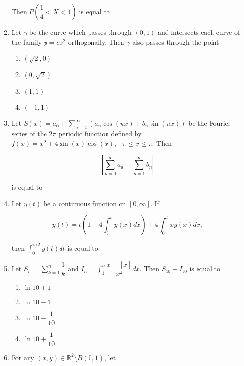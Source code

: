 \documentclass[journal]{IEEEtran}
\newcommand{\brak}[1]{\left( #1 \right)}
\newcommand{\sbrak}[1]{\left[ #1 \right]}
\newcommand{\abs}[1]{\left| #1 \right|}
\newcommand{\lt}{<}
\begin{document}
\begin{enumerate}
    Then $P\brak{\dfrac{1}{4} \lt X \lt 1}$ is equal to \underline{\hspace{2cm}}

\item Let $\gamma$ be the curve which passes through $\brak{0,1}$ and intersects each curve of the family $y = c x^2$ orthogonally. Then $\gamma$ also passes through the point

    \begin{enumerate}
        \item $\brak{\sqrt{2},0}$
        \item $\brak{0,\sqrt{2}}$
        \item $\brak{1,1}$
        \item $\brak{-1,1}$
    \end{enumerate}

\item Let $S\brak{x} = a_0 + \sum_{n=1}^{\infty}\brak{a_n \cos\brak{n x} + b_n \sin\brak{n x}}$ be the Fourier series of the $2 \pi$ periodic function defined by $f\brak{x} = x^2 + 4 \sin\brak{x} \cos\brak{x}, -\pi \le x \le \pi$. Then 

    $$\abs{\sum_{n=0}^{\infty} a_n - \sum_{n=1}^{\infty} b_n}$$

    is equal to \underline{\hspace{2cm}}

\item Let $y\brak{t}$ be a continuous function on $\sbrak{0,\infty}$. If

    $$y\brak{t} = t\brak{1 - 4\int_{0}^{t}y\brak{x}dx} + 4\int_{0}^{t}x y\brak{x}dx,$$

    then $\int_{0}^{\pi/2} y\brak{t} dt$ is equal to \underline{\hspace{2cm}}

\item Let $S_n = \sum_{k=1}^{n} \dfrac{1}{k}$ and $I_n = \int_{1}^{n} \dfrac{x - \sbrak{x}}{x^2} dx$. Then $S_{10} + I_{10}$ is equal to

    \begin{enumerate}
        \item $\ln 10 + 1$
        \item $\ln 10 - 1$
        \item $\ln 10 - \dfrac{1}{10}$
        \item $\ln 10 + \dfrac{1}{10}$
    \end{enumerate}

\item For any $\brak{x,y} \in \mathbb{R}^2 \setminus B\brak{0,1}$, let


\end{enumerate}
\end{document}
